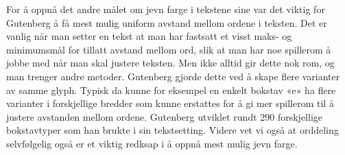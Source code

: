 
For å oppnå det andre målet om jevn farge i tekstene sine var det viktig for Gutenberg å få mest mulig uniform avstand mellom ordene i teksten. Det er vanlig når man setter en tekst at man har fastsatt et visst maks- og minimumsmål for tillatt avstand mellom ord, slik at man har noe spillerom å jobbe med når man skal justere teksten. Men ikke alltid gir dette nok rom, og man trenger andre metoder. Gutenberg gjorde dette ved å skape flere varianter av samme glyph. Typisk da kunne for eksempel en enkelt bokstav «e» ha flere varianter i forskjellige bredder som kunne erstattes for å gi mer spillerom til å justere avstanden mellom ordene. Gutenberg utviklet rundt 290 forskjellige bokstavtyper som han brukte i sin tekstsetting. Videre vet vi også at orddeling selvfølgelig også er et viktig redksap i å oppnå mest mulig jevn farge.

